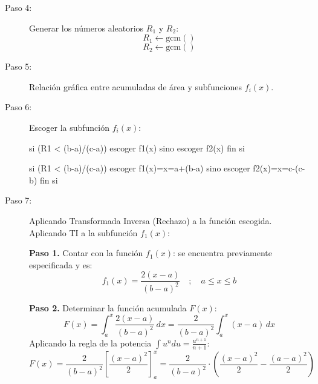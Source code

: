 \documentclass{article}
\begin{document}
\begin{description}
    \item[Paso 4:] Generar los números aleatorios $R_1$ y $R_2$:
    $$ R_1 \leftarrow \text{gcm}() $$
    $$ R_2 \leftarrow \text{gcm}() $$

    \item[Paso 5:] Relación gráfica entre acumuladas de área y subfunciones $f_i(x)$.

    
    \shorthandoff{>} 
    \shorthandon{>}
    

    \item[Paso 6:]Escoger la subfunción $f_i(x)$:
    \begin{Algoritmo}{}
si (R1 < (b-a)/(c-a))
    escoger f1(x)
sino
    escoger f2(x)
fin si
    \end{Algoritmo}
    \begin{Algoritmo}{}
si (R1 < (b-a)/(c-a))
    escoger f1(x)=x=a+(b-a)
sino
    escoger f2(x)=x=c-(c-b)
fin si
    \end{Algoritmo}

    \item[Paso 7:] Aplicando Transformada Inversa (Rechazo) a la 
    función escogida.\\
    Aplicando TI a la subfunción $f_1(x)$:

    \textbf{Paso 1.} Contar con la función $f_1(x)$: 
    se encuentra previamente especificada y es:
    $$ f_1(x) = \frac{2(x-a)}{(b-a)^2} \quad ; \quad a \leq x \leq b $$

    \textbf{Paso 2.} Determinar la función acumulada $F(x)$:
    $$ F(x) = \int_a^x \frac{2(x-a)}{(b-a)^2}\,dx = \frac{2}{(b-a)^2} \int_a^x (x-a)\,dx $$
    Aplicando la regla de la potencia $\int u^n du = \frac{u^{n+1}}{n+1}$:
    $$ F(x) = \frac{2}{(b-a)^2} \left[ \frac{(x-a)^2}{2} \right]_a^x = \frac{2}{(b-a)^2} \cdot \left( \frac{(x-a)^2}{2} - \frac{(a-a)^2}{2} \right) $$


\end{description}
\end{document}
